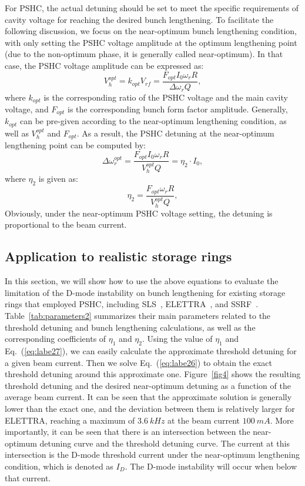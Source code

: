 \documentclass[%
 reprint,
 amsmath,amssymb,
 aps,
]{revtex4-1}
\begin{document}
For PSHC, the actual detuning should be set to meet the specific requirements of cavity voltage for reaching the desired bunch lengthening. To facilitate the following discussion, we focus on the near-optimum bunch lengthening condition, with only setting the PSHC voltage amplitude at the optimum lengthening point (due to the non-optimum phase, it is generally called near-optimum). In that case, the PSHC voltage amplitude can be expressed as:
\begin{equation}\label{eq:labe29}
   V^{opt}_h=k_{opt}V_{rf}=\frac{F_{opt}I_0 \omega_r R}{\Delta\omega_r Q},
\end{equation}
where $k_{opt}$ is the corresponding ratio of the PSHC voltage and the main cavity voltage, and $F_{opt}$ is the corresponding bunch form factor amplitude. Generally, $k_{opt}$ can be pre-given according to the near-optimum lengthening condition, as well as $V^{opt}_h$ and $F_{opt}$. As a result, the PSHC detuning at the near-optimum lengthening point can be computed by:
\begin{equation}\label{eq:labe30}
   \Delta\omega^{opt}_r= \frac{F_{opt}I_0 \omega_r R}{V^{opt}_h Q}=\eta_2 \cdot I_0,
\end{equation}
where $\eta_2$ is given as:
\begin{equation}\label{eq:labe31}
   \eta_2= \frac{F_{opt} \omega_r R}{V^{opt}_h Q},
\end{equation}
Obviously, under the near-optimum PSHC voltage setting, the detuning is proportional to the beam current. 

\subsection{\label{sec:level4.2} Application to realistic storage rings}

In this section, we will show how to use the above equations to evaluate the limitation of the D-mode instability on bunch lengthening for existing storage rings that employed PSHC, including SLS~\cite{SLS14}, ELETTRA~\cite{ELETTRA15, Penco16}, and SSRF~\cite{Wu17}. Table~\ref{tab:parameters2} summarizes their main parameters related to the threshold detuning and bunch lengthening calculations, as well as the corresponding coefficients of $\eta_1$ and $\eta_2$. Using the value of $\eta_1$ and Eq.~(\ref{eq:labe27}), we can easily calculate the approximate threshold detuning for a given beam current. Then we solve Eq.~(\ref{eq:labe26}) to obtain the exact threshold detuning around this approximate one. Figure~\ref{fig4} shows the resulting threshold detuning and the desired near-optimum detuning as a function of the average beam current. It can be seen that the approximate solution is generally lower than the exact one, and the deviation between them is relatively larger for ELETTRA, reaching a maximum of $\SI{3.6}{kHz}$ at the beam current $\SI{100}{mA}$. More importantly, it can be seen that there is an intersection between the near-optimum detuning curve and the threshold detuning curve. The current at this intersection is the D-mode threshold current under the near-optimum lengthening condition, which is denoted as $I_D$. The D-mode instability will occur when below that current.
\end{document}
